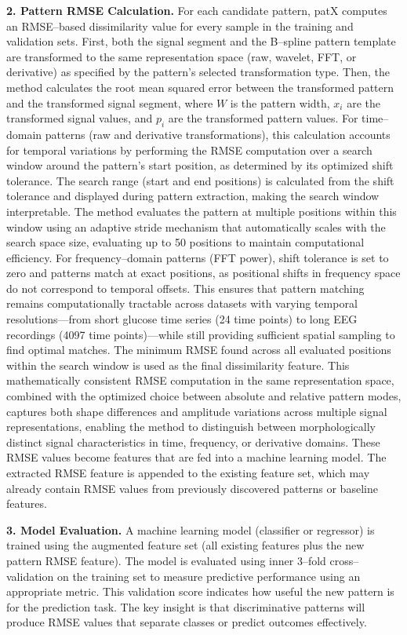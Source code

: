 \documentclass[11pt]{article}
\begin{document}
\textbf{2. Pattern RMSE Calculation.}
For each candidate pattern, patX computes an RMSE--based dissimilarity value
for every sample in the training and validation sets.
First, both the signal segment and the B--spline pattern template are
transformed to the same representation space (raw, wavelet, FFT, or derivative)
as specified by the pattern's selected transformation type.
Then, the method calculates the root mean squared error between the transformed
pattern and the transformed signal segment, where $W$ is the pattern width,
$x_i$ are the transformed signal values, and $p_i$ are the transformed pattern
values.
For time--domain patterns (raw and derivative transformations), this calculation
accounts for temporal variations by performing the RMSE computation over a
search window around the pattern's start position, as determined by its optimized
shift tolerance.
The search range (start and end positions) is calculated from the shift tolerance
and displayed during pattern extraction, making the search window interpretable.
The method evaluates the pattern at multiple positions within this window using
an adaptive stride mechanism that automatically scales with the search space
size, evaluating up to 50 positions to maintain computational efficiency.
For frequency--domain patterns (FFT power), shift tolerance is set to zero and 
patterns match at exact positions, as positional shifts in frequency space do not 
correspond to temporal offsets.
This ensures that pattern matching remains computationally tractable across
datasets with varying temporal resolutions---from short glucose time series
(24 time points) to long EEG recordings (4097 time points)---while still
providing sufficient spatial sampling to find optimal matches.
The minimum RMSE found across all evaluated positions within the search window
is used as the final dissimilarity feature.
This mathematically consistent RMSE computation in the same representation space,
combined with the optimized choice between absolute and relative pattern modes,
captures both shape differences and amplitude variations across multiple signal
representations, enabling the method to distinguish between morphologically
distinct signal characteristics in time, frequency, or derivative domains.
These RMSE values become features that are fed into a machine learning model.
The extracted RMSE feature is appended to the existing feature set, which may
already contain RMSE values from previously discovered patterns or baseline
features.

\textbf{3. Model Evaluation.}
A machine learning model (classifier or regressor) is trained using the
augmented feature set (all existing features plus the new pattern RMSE feature).
The model is evaluated using inner 3--fold cross--validation on the training
set to measure predictive performance using an appropriate metric.
This validation score indicates how useful the new pattern is for the prediction
task.
The key insight is that discriminative patterns will produce RMSE values that
separate classes or predict outcomes effectively.
\end{document}
